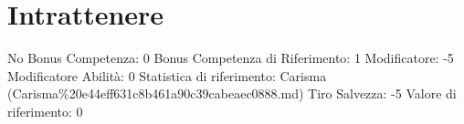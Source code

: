 \section{Intrattenere}\label{intrattenere}

\begin{description}
\tightlist
\item[Tags: ABI]
No Bonus Competenza: 0 Bonus Competenza di Riferimento: 1 Modificatore:
-5 Modificatore Abilità: 0 Statistica di riferimento: Carisma
(Carisma\%20e44eff631c8b461a90c39cabeaec0888.md) Tiro Salvezza: -5
Valore di riferimento: 0
\end{description}
